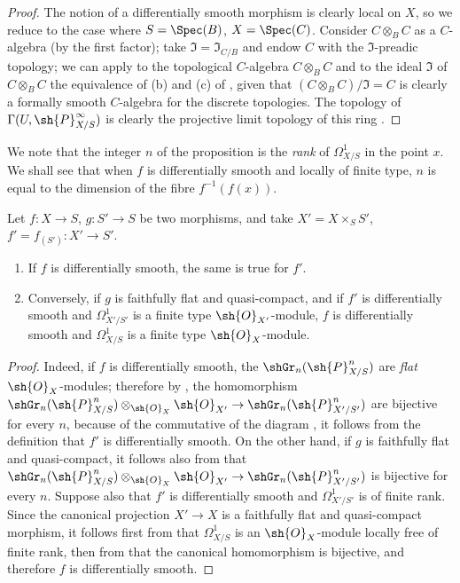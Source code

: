 \begin{proof}
The notion of a differentially smooth morphism is clearly local on $X$, so we reduce to the case where $S = \Spec(B)$, $X = \Spec(C)$.
Consider $C \otimes_B C$ as a $C$-algebra (by the first factor);
take $\mathfrak{I} = \mathfrak{I}_{C/B}$ and endow $C$ with the $\mathfrak{I}$-preadic topology;
we can apply to the topological $C$-algebra $C \otimes_B C$ and to the ideal $\mathfrak{I}$ of $C \otimes_B C$ the equivalence of (b) and (c) of , given that $(C \otimes_B C)/\mathfrak{I} = C$ is clearly a formally smooth $C$-algebra for the discrete topologies.
The topology of $\Gamma(U, \sh{P}_{X/S}^\infty)$ is clearly the projective limit topology of this ring .
\end{proof}

We note that the integer $n$ of the proposition  is the \emph{rank} of $\Omega_{X/S}^1$ in the point $x$.
We shall see  that when $f$ is differentially smooth and locally of finite type, $n$ is equal to the dimension of the fibre $f^{-1}(f(x))$. 

\begin{proposition}[16.10.4]
\label{IV.16.10.4}
Let $f:X \to S$, $g:S' \to S$ be two morphisms, and take $X' = X \times_S S'$, $f' = f_{(S')}:X' \to S'$.
\begin{enumerate}
  \item[\rm{(i)}] If $f$ is differentially smooth, the same is true for $f'$. 
  \item[\rm{(ii)}] Conversely, if $g$ is faithfully flat and quasi-compact, and if $f'$ is differentially smooth and $\Omega_{X'/S'}^1$ is a finite type $\sh{O}_{X'}$-module, $f$ is differentially smooth and $\Omega_{X/S}^1$ is a finite type $\sh{O}_X$-module.
\end{enumerate}
\end{proposition}

\begin{proof}
Indeed, if $f$ is differentially smooth, the $\shGr_n(\sh{P}_{X/S}^n)$ are \emph{flat} $\sh{O}_X$-modules;
therefore by , the homomorphism $\shGr_n(\sh{P}_{X/S}^n) \otimes_{\sh{O}_X} \sh{O}_{X'} \to \shGr_n(\sh{P}_{X'/S'}^n)$ are bijective for every $n$, because of the commutative of the diagram , it follows from the definition  that $f'$ is differentially smooth.
On the other hand, if $g$ is faithfully flat and quasi-compact, it follows also from  that $\shGr_n(\sh{P}_{X/S}^n) \otimes_{\sh{O}_X} \sh{O}_{X'} \to \shGr_n(\sh{P}_{X'/S'}^n)$ is bijective for every $n$.
Suppose also that $f'$ is differentially smooth and $\Omega_{X'/S'}^1$ is of finite rank.
Since the canonical projection $X' \to X$ is a faithfully flat and quasi-compact morphism, it follows first from  that $\Omega_{X/S}^1$ is an $\sh{O}_X$-module locally free of finite rank, then from  that the canonical homomorphism  is bijective, and therefore $f$ is differentially smooth.
\end{proof}

